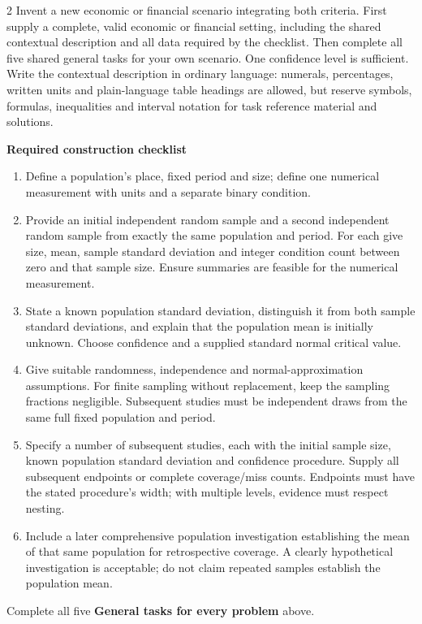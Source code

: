 \begin{multicols}{2}
Invent a new economic or financial scenario integrating both criteria. First supply a complete, valid economic or financial setting, including the shared contextual description and all data required by the checklist. Then complete all five shared general tasks for your own scenario. One confidence level is sufficient. Write the contextual description in ordinary language: numerals, percentages, written units and plain-language table headings are allowed, but reserve symbols, formulas, inequalities and interval notation for task reference material and solutions.

\textbf{Required construction checklist}
\begin{enumerate}
\item Define a population's place, fixed period and size; define one numerical measurement with units and a separate binary condition.
\item Provide an initial independent random sample and a second independent random sample from exactly the same population and period. For each give size, mean, sample standard deviation and integer condition count between zero and that sample size. Ensure summaries are feasible for the numerical measurement.
\item State a known population standard deviation, distinguish it from both sample standard deviations, and explain that the population mean is initially unknown. Choose confidence and a supplied standard normal critical value.
\item Give suitable randomness, independence and normal-approximation assumptions. For finite sampling without replacement, keep the sampling fractions negligible. Subsequent studies must be independent draws from the same full fixed population and period.
\item Specify a number of subsequent studies, each with the initial sample size, known population standard deviation and confidence procedure. Supply all subsequent endpoints or complete coverage/miss counts. Endpoints must have the stated procedure's width; with multiple levels, evidence must respect nesting.
\item Include a later comprehensive population investigation establishing the mean of that same population for retrospective coverage. A clearly hypothetical investigation is acceptable; do not claim repeated samples establish the population mean.
\end{enumerate}

\par\smallskip
Complete all five \textbf{General tasks for every problem} above.




\end{multicols}

